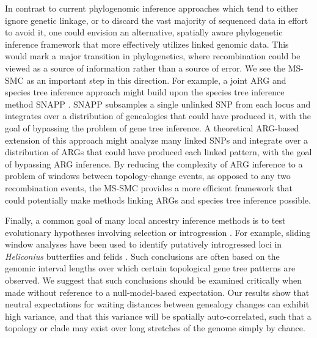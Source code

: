 \documentclass[11pt]{article}
\begin{document}
In contrast to current phylogenomic inference approaches which tend to 
either ignore genetic linkage, or to discard the vast majority of 
sequenced data in effort to avoid it, one could envision an 
alternative, spatially aware phylogenetic inference framework 
that more effectively utilizes linked genomic data. 
This would mark a major transition in phylogenetics, where
recombination could be viewed as a source of information rather than 
a source of error. We see the MS-SMC as an important step in this 
direction. 
For example, a joint ARG and species tree inference approach might build upon the 
species tree inference method SNAPP \citep{bryant2012inferring}. 
SNAPP subsamples a single unlinked SNP from each locus and integrates over a 
distribution of genealogies that could have produced it, with the goal
of bypassing the problem of gene tree inference. 
A theoretical ARG-based extension of this approach might 
analyze many linked SNPs and integrate over a distribution of ARGs that 
could have produced each linked pattern, with the goal of bypassing ARG inference.
By reducing the complexity of ARG inference to a problem of windows between 
topology-change events, as opposed to any two recombination events, 
the MS-SMC provides a more efficient framework that could potentially
make methods linking ARGs and species tree inference possible.

Finally, a common goal of many local ancestry inference methods is to test 
evolutionary hypotheses involving selection or introgression \citep{martin_exploring_2017}.
For example, sliding window analyses have been used to identify putatively 
introgressed loci in \emph{Heliconius} butterflies \citep{zhang2016genome} 
and felids \citep{li2019recombination}. Such conclusions are often based on 
the genomic interval lengths over which certain topological gene tree patterns 
are observed. We suggest that such conclusions should be examined 
critically when made without reference to a null-model-based expectation.
Our results show that neutral expectations for waiting distances between 
genealogy changes can exhibit high variance, and that this variance will
be spatially auto-correlated, such that a topology or clade may exist over
long stretches of the genome simply by chance.
\end{document}
